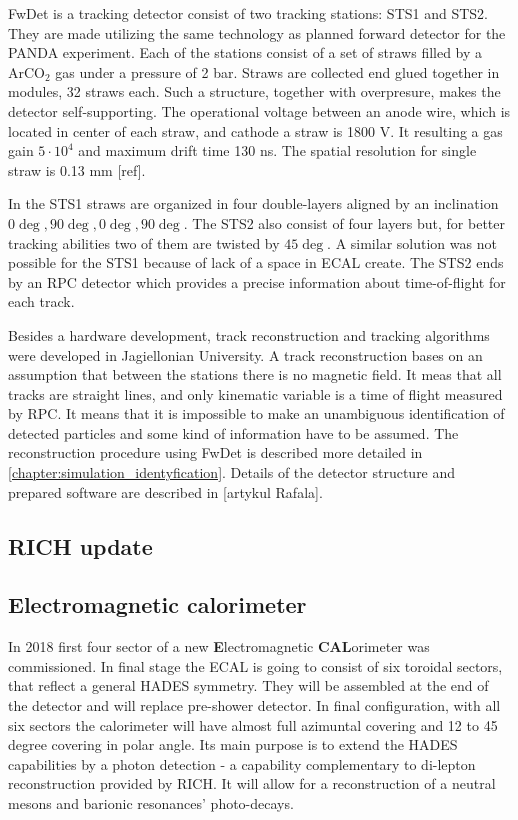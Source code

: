 FwDet is a tracking detector consist of two tracking stations: STS1 and STS2. They are made utilizing the same technology as planned forward detector for the PANDA experiment. Each of the stations consist of a set of straws filled by a ArCO$_2$ gas under a pressure of 2 bar. Straws are collected end glued together in modules, 32 straws each. Such a structure, together with overpresure, makes the detector self-supporting. The operational voltage between an anode wire, which is located in center of each straw, and cathode a straw is 1800 V. It resulting a gas gain $5 \cdot 10^4$ and maximum drift time 130 ns. The spatial resolution for single straw is 0.13 mm [ref].

In the STS1 straws are organized in four double-layers aligned by an inclination $0\deg, 90\deg, 0\deg, 90\deg$. The STS2 also consist of four layers but, for better tracking abilities two of them are twisted by $45\deg$. A similar solution was not possible for the STS1 because of lack of a space in ECAL create. The STS2 ends by an RPC detector which provides a precise information about time-of-flight for each track.

Besides a hardware development, track reconstruction and tracking algorithms were developed in Jagiellonian University. A track reconstruction bases on an assumption that between the stations there is no magnetic field. It meas that all tracks are straight lines, and only kinematic variable is a time of flight measured by RPC. It means that it is impossible to make an unambiguous identification of detected particles and some kind of information have to be assumed. The reconstruction procedure using FwDet is described more detailed in \ref{chapter:simulation_identyfication}. Details of the detector structure and prepared software are described in [artykul Rafala]. 
\subsection{RICH update}

\subsection{Electromagnetic calorimeter}
In 2018 first four sector of a new \textbf{E}lectromagnetic \textbf{CAL}orimeter was commissioned. In final stage the ECAL is going to consist of six toroidal sectors, that reflect a general HADES symmetry. They will be assembled at the end of the detector and will replace pre-shower detector. In final configuration, with all six sectors the calorimeter will have almost full azimuntal covering and 12 to 45 degree covering in polar angle. Its main purpose is to extend the HADES capabilities by a photon detection - a capability complementary to di-lepton reconstruction provided by RICH. It will allow for a reconstruction of a neutral mesons and barionic resonances' photo-decays.

